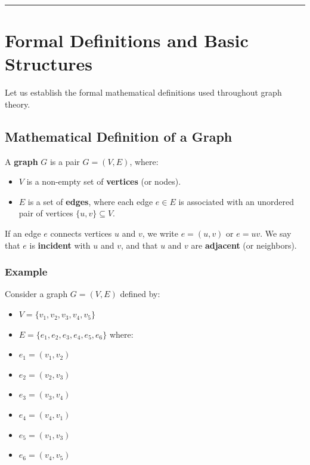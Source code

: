 \documentclass[
]{book}
\providecommand{\tightlist}{%
  \setlength{\itemsep}{0pt}\setlength{\parskip}{0pt}}
\theoremstyle{definition}
\theoremstyle{definition}
\theoremstyle{definition}
\theoremstyle{definition}
\theoremstyle{remark}
\begin{document}
\begin{center}\rule{0.5\linewidth}{0.5pt}\end{center}

\section{Formal Definitions and Basic Structures}\label{formal-definitions-and-basic-structures}

Let us establish the formal mathematical definitions used throughout graph theory.

\subsection{Mathematical Definition of a Graph}\label{mathematical-definition-of-a-graph}

A \textbf{graph} \(G\) is a pair \(G = (V, E)\), where:

\begin{itemize}
\tightlist
\item
  \(V\) is a non-empty set of \textbf{vertices} (or nodes).
\item
  \(E\) is a set of \textbf{edges}, where each edge \(e \in E\) is associated with an unordered pair of vertices \(\{u, v\} \subseteq V\).
\end{itemize}

If an edge \(e\) connects vertices \(u\) and \(v\), we write \(e = (u, v)\) or \(e = uv\). We say that \(e\) is \textbf{incident} with \(u\) and \(v\), and that \(u\) and \(v\) are \textbf{adjacent} (or neighbors).

\subsubsection{Example}\label{example}

Consider a graph \(G = (V, E)\) defined by:

\begin{itemize}
\tightlist
\item
  \(V = \{v_1, v_2, v_3, v_4, v_5\}\)
\item
  \(E = \{e_1, e_2, e_3, e_4, e_5, e_6\}\) where:
\item
  \(e_1 = (v_1, v_2)\)
\item
  \(e_2 = (v_2, v_3)\)
\item
  \(e_3 = (v_3, v_4)\)
\item
  \(e_4 = (v_4, v_1)\)
\item
  \(e_5 = (v_1, v_3)\)
\item
  \(e_6 = (v_4, v_5)\)
\end{itemize}
\end{document}
